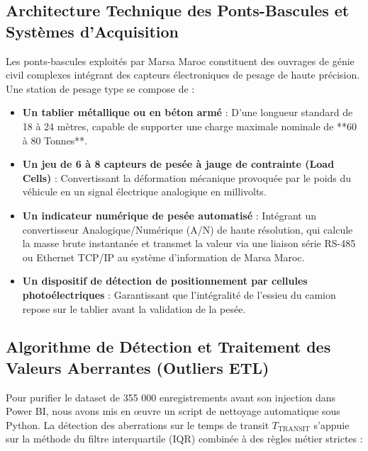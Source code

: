 \documentclass[12pt,a4paper,oneside]{report}
\begin{document}
\subsection{Architecture Technique des Ponts-Bascules et Systèmes d'Acquisition}
Les ponts-bascules exploités par Marsa Maroc constituent des ouvrages de génie civil complexes intégrant des capteurs électroniques de pesage de haute précision. Une station de pesage type se compose de :
\begin{itemize}
    \item \textbf{Un tablier métallique ou en béton armé} : D'une longueur standard de 18 à 24 mètres, capable de supporter une charge maximale nominale de **60 à 80 Tonnes**.
    \item \textbf{Un jeu de 6 à 8 capteurs de pesée à jauge de contrainte (Load Cells)} : Convertissant la déformation mécanique provoquée par le poids du véhicule en un signal électrique analogique en millivolts.
    \item \textbf{Un indicateur numérique de pesée automatisé} : Intégrant un convertisseur Analogique/Numérique (A/N) de haute résolution, qui calcule la masse brute instantanée et transmet la valeur via une liaison série RS-485 ou Ethernet TCP/IP au système d'information de Marsa Maroc.
    \item \textbf{Un dispositif de détection de positionnement par cellules photoélectriques} : Garantissant que l'intégralité de l'essieu du camion repose sur le tablier avant la validation de la pesée.
\end{itemize}

\subsection{Algorithme de Détection et Traitement des Valeurs Aberrantes (Outliers ETL)}
Pour purifier le dataset de 355 000 enregistrements avant son injection dans Power BI, nous avons mis en œuvre un script de nettoyage automatique sous Python. La détection des aberrations sur le temps de transit $T_{\text{TRANSIT}}$ s'appuie sur la méthode du filtre interquartile (IQR) combinée à des règles métier strictes :
\end{document}

